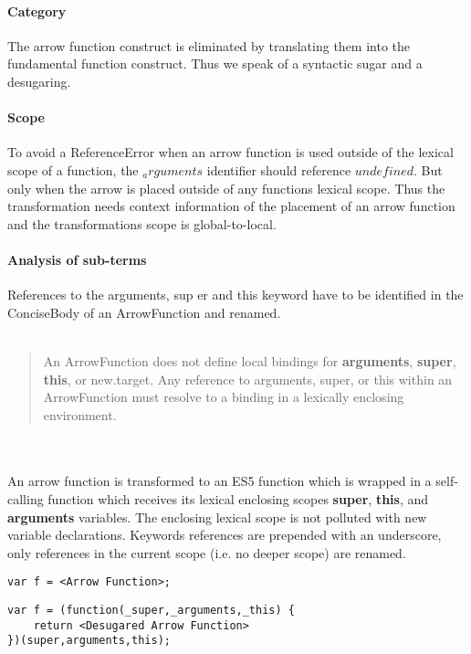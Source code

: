 \paragraph{Category}
The arrow function construct is eliminated by translating them into the fundamental function construct. Thus we speak of a syntactic sugar and a desugaring.

\paragraph{Scope}
To avoid a ReferenceError when an arrow function is used outside of the lexical scope of a function, the $_arguments$ identifier should reference $undefined$. But only when the arrow is placed outside of any functions lexical scope. Thus the transformation needs context information of the placement of an arrow function and the transformations scope is global-to-local.

\paragraph{Analysis of sub-terms}
References to the arguments, sup
er and this keyword have to be identified in the ConciseBody of an ArrowFunction and renamed.
\\
\\
\blockquote[{\cite[14.2.16]{SpecJS}}]{An ArrowFunction does not define local bindings for \textbf{arguments}, \textbf{super}, \textbf{this}, or new.target. Any reference to arguments, super, or this within an ArrowFunction must resolve to a binding in a lexically enclosing environment.}
\\\\
An arrow function is transformed to an ES5 function which is wrapped in a self-calling function which receives its lexical enclosing scopes \textbf{super}, \textbf{this}, and \textbf{arguments} variables. The enclosing lexical scope is not polluted with new variable declarations. Keywords references are prepended with an underscore, only references in the current scope (i.e. no deeper scope) are renamed.

\begin{lstlisting}
var f = <Arrow Function>;
\end{lstlisting}

\begin{lstlisting}
var f = (function(_super,_arguments,_this) {
	return <Desugared Arrow Function>
})(super,arguments,this);
\end{lstlisting}

